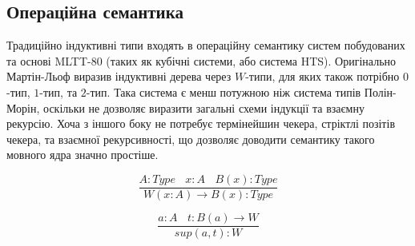 \subsection{Операційна семантика}
Традиційно індуктивні типи входять в операційну семантику систем побудованих
та основі MLTT-80 (таких як кубічні системи, або система HTS).
Оригінально Мартін-Льоф виразив індуктивні дерева через $W$-типи, для яких
також потрібно $0$-тип, $1$-тип, та $2$-тип. Така система є менш потужною ніж система типів Полін-Морін,
оскільки не дозволяє виразити загальні схеми індукції та взаємну рекурсію. Хоча з іншого
боку не потребує термінейшин чекера, стріктлі позітів чекера, та взаємної рекурсивності,
що дозволяє доводити семантику такого мовного ядра значно простіше.

\begin{equation}
\tag{$W$-formation}
\dfrac
{A:Type\ \ \ \ x:A\ \ \ \ B(x):Type}
{W (x:A) \rightarrow B(x) : Type}
\end{equation}

\begin{equation}
\tag{$W$-intro}
\dfrac
{a:A\ \ \ \ t: B(a) \rightarrow W}
{sup(a,t) : W}
\end{equation}

